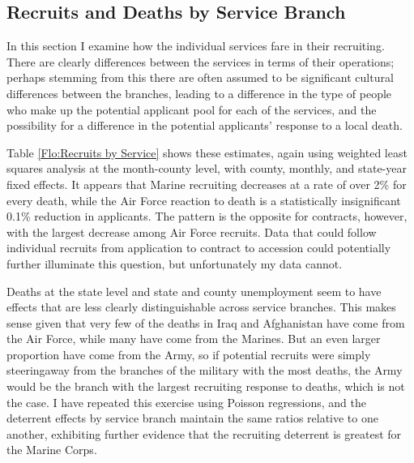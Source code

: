 \documentclass[12pt] {article}
\begin{document}
\begin{table}
\caption{}
\label{Flo:paygrade}
\scalebox{0.7}{
}
\end{table}
  
\subsection{Recruits and Deaths by Service Branch}\label{sec:servicebranch}
In this section I examine how the individual services fare in their recruiting. There are clearly differences between the services in terms of their operations; perhaps stemming from this there are often assumed to be significant cultural differences between the branches, leading to a difference in the type of people who make up the potential applicant pool for each of the services, and the possibility for a difference in the potential applicants' response to a local death.

Table \ref{Flo:Recruits by Service} shows these estimates, again using weighted least squares analysis at the month-county level, with county, monthly, and state-year fixed effects. It appears that Marine recruiting decreases at a rate of over 2\% for every death, while the Air Force reaction to death is a statistically insignificant 0.1\% reduction in applicants. The pattern is the opposite for contracts, however, with the largest decrease among Air Force recruits. Data that could follow individual recruits from application to contract to accession could potentially further illuminate this question, but unfortunately my data cannot. 

Deaths at the state level and state and county unemployment seem to have effects that are less clearly distinguishable across service branches. This makes sense given that very few of the deaths in Iraq and Afghanistan have come from the Air Force, while many have come from the Marines. But an even larger proportion have come from the Army, so if potential recruits were simply steeringaway from the branches of the military with the most deaths, the Army would be the branch with the largest recruiting response to deaths, which is not the case. I have repeated this exercise using Poisson regressions, and the deterrent effects by service branch maintain the same ratios relative to one another, exhibiting further evidence that the recruiting deterrent is greatest for the Marine Corps. 
\end{document}
